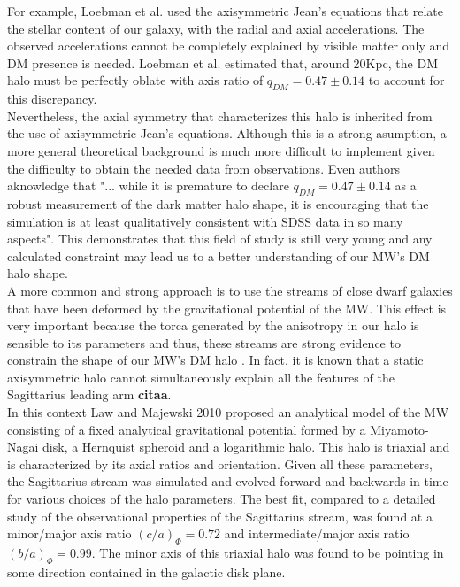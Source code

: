 For example, Loebman et al. \cite{Loebman et al 2012} used the axisymmetric Jean's equations \cite{Jean 2015} that relate the stellar content of our galaxy, with the radial and axial accelerations. 
The observed accelerations cannot be completely explained by visible matter only and DM presence is needed. Loebman et al. estimated that, around 20Kpc, the DM halo must be perfectly oblate with axis ratio of $q_{DM}=0.47 \pm 0.14$ to account for this discrepancy.\\

Nevertheless, the axial symmetry that characterizes this halo is inherited from the use of axisymmetric Jean's equations. 
Although this is a strong asumption, a more general theoretical background is much more difficult to implement given the difficulty to obtain the needed data from observations. 
Even authors aknowledge that "... while it is premature to declare $q_{DM}=0.47 \pm 0.14$ as a robust measurement of the dark matter halo shape, it is encouraging that the simulation is at least qualitatively consistent with SDSS data in so many aspects".
This demonstrates that this field of study is still very young and any calculated constraint may lead us to a better understanding of our MW's DM halo shape.\\

A more common and strong approach is to use the streams of close dwarf galaxies that have been deformed by the gravitational potential of the MW. 
This effect is very important because the torca generated by the anisotropy in our halo is sensible to its parameters and thus, these streams are strong evidence to constrain the shape of our MW's DM halo \cite{See Law-Majewski references}. 
In fact, it is known that a static axisymmetric halo cannot simultaneously explain all the features of the Sagittarius leading arm \textbf{citaa}. \\

In this context Law and Majewski 2010 proposed an analytical model of the MW consisting of a fixed analytical gravitational potential formed by a Miyamoto-Nagai \cite{Miyamoto-Nagai 1985} disk, a Hernquist spheroid and a logarithmic halo. 
This halo is triaxial and is characterized by its axial ratios and orientation. 
Given all these parameters, the Sagittarius stream was simulated and evolved forward and backwards in time for various choices of the halo parameters. 
The best fit, compared to a detailed study of the observational properties of the Sagittarius stream, was found at a minor/major axis ratio $(c/a)_{\Phi}=0.72$ and intermediate/major axis ratio $(b/a)_{\Phi}=0.99$. The minor axis of this triaxial halo was found to be pointing in some direction contained in the galactic disk plane. \\

